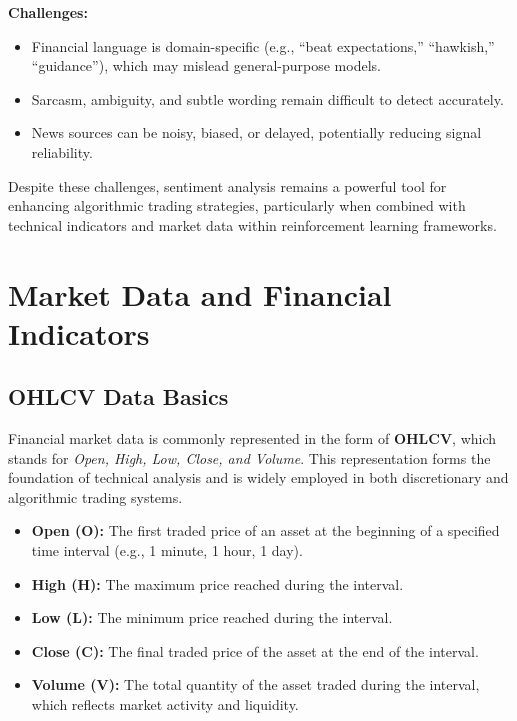 \documentclass[12pt,a4paper]{report}
\begin{document}
\bigskip
\textbf{Challenges:}
\begin{itemize}
    \item Financial language is domain-specific (e.g., “beat expectations,” “hawkish,” “guidance”), which may mislead general-purpose models.
    \item Sarcasm, ambiguity, and subtle wording remain difficult to detect accurately.
    \item News sources can be noisy, biased, or delayed, potentially reducing signal reliability.
\end{itemize}

Despite these challenges, sentiment analysis remains a powerful tool for enhancing algorithmic trading strategies, particularly when combined with technical indicators and market data within reinforcement learning frameworks.




\section{Market Data and Financial Indicators}

\subsection{OHLCV Data Basics}

Financial market data is commonly represented in the form of \textbf{OHLCV}, which stands for \textit{Open, High, Low, Close, and Volume}. This representation forms the foundation of technical analysis and is widely employed in both discretionary and algorithmic trading systems.

\begin{itemize}
    \item \textbf{Open (O):} The first traded price of an asset at the beginning of a specified time interval (e.g., 1 minute, 1 hour, 1 day).
    \item \textbf{High (H):} The maximum price reached during the interval.
    \item \textbf{Low (L):} The minimum price reached during the interval.
    \item \textbf{Close (C):} The final traded price of the asset at the end of the interval.
    \item \textbf{Volume (V):} The total quantity of the asset traded during the interval, which reflects market activity and liquidity.
\end{itemize}
\end{document}
